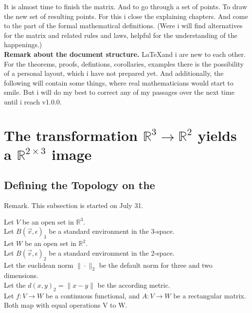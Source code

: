 \documentclass[a4paper]{article}
\begin{document}
It is almost time to finish the matrix. And to go through a set of points. To draw the new set of resulting points.
For this i close the explaining chapters. And come to the part of the formal mathematical definitions. (Were i will
find alternatives for the matrix and related rules and laws, helpful for the understanding of the happenings.)\\

\textbf{Remark about the document structure.} \LaTeX and i are new to each other. For the theorems, proofs, defintions, corollaries, examples there is the possibility of a personal layout, which i have not prepared yet. And additionally, the following will contain some things, where real
mathematicians would start to smile. But i will do my best to correct any of my passages over the next time until i reach v1.0.0.\\

\section{The transformation $\mathbb{R}^{3} \rightarrow \mathbb{R}^{2}$ yields a $\mathbb{R}^{2\times{3}}$ image}

\subsection{Defining the Topology on the }

Remark. This subsection is started on July 31. 

Let $V$ be an open set in $\mathbb{R}^{3}$.\\

Let $B(\vec{v}, \epsilon)_{3}$ be a standard environment in the 3-space.\\

Let $W$ be an open set in $\mathbb{R}^{2}$.\\

Let $B(\vec{v}, \epsilon)_{2}$ be a standard environment in the 2-space.\\

Let the euclidean norm $\|\cdot\|_{2}$ be the default norm for three and two dimensions.\\

Let the $d(x,y)_{2} = \|x-y\|$ be the according metric.\\

Let $f:V\rightarrow W$ be a continuous functional, and $A:V\rightarrow W$ be a rectangular matrix. Both map with equal operations V to W.\\
\end{document}
